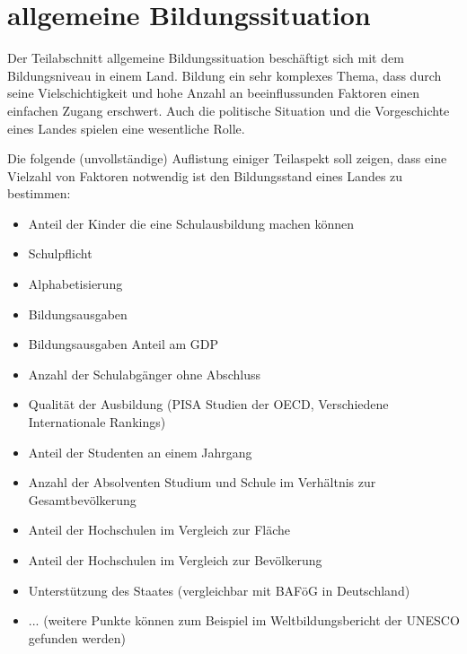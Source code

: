 \section{allgemeine Bildungssituation}
Der Teilabschnitt allgemeine Bildungssituation beschäftigt sich mit dem Bildungsniveau in einem Land. Bildung ein sehr komplexes Thema, dass durch seine Vielschichtigkeit und hohe Anzahl an beeinflussunden Faktoren einen einfachen Zugang erschwert. Auch die politische Situation und die Vorgeschichte eines Landes spielen eine wesentliche Rolle.

Die folgende (unvollständige) Auflistung einiger Teilaspekt soll zeigen, dass eine Vielzahl von Faktoren notwendig ist den Bildungsstand eines Landes zu bestimmen:
\begin{itemize} 
\item Anteil der Kinder die eine Schulausbildung machen können
\item Schulpflicht
\item Alphabetisierung
\item Bildungsausgaben
\item Bildungsausgaben Anteil am GDP
\item Anzahl der Schulabgänger ohne Abschluss
\item Qualität der Ausbildung (PISA Studien der OECD, Verschiedene Internationale Rankings)
\item Anteil der Studenten an einem Jahrgang
\item Anzahl der Absolventen Studium und Schule im Verhältnis zur Gesamtbevölkerung
\item Anteil der Hochschulen im Vergleich zur Fläche
\item Anteil der Hochschulen im Vergleich zur Bevölkerung
\item Unterstützung des Staates (vergleichbar mit BAFöG in Deutschland)
\item ... (weitere Punkte können zum Beispiel im Weltbildungsbericht der UNESCO gefunden werden)
\end{itemize}

